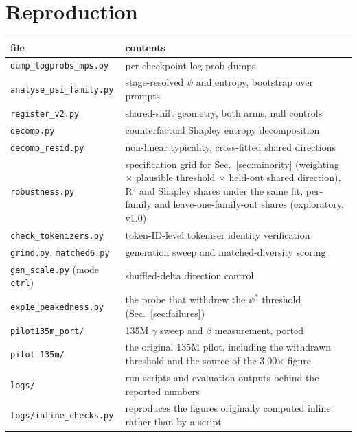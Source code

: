 \documentclass[11pt]{article}
\begin{document}
\appendix

\section{Reproduction}

\begin{center}
\begin{tabular}{p{} p{}}
\toprule
file & contents \\
\midrule
\texttt{dump\_logprobs\_mps.py} & per-checkpoint log-prob dumps \\
\texttt{analyse\_psi\_family.py} & stage-resolved $\psi$ and entropy, bootstrap over prompts \\
\texttt{register\_v2.py} & shared-shift geometry, both arms, null controls \\
\texttt{decomp.py} & counterfactual Shapley entropy decomposition \\
\texttt{decomp\_resid.py} & non-linear typicality, cross-fitted shared directions \\
\texttt{robustness.py} & specification grid for Sec.~\ref{sec:minority} (weighting $\times$ plausible threshold $\times$ held-out shared direction), R$^2$ and Shapley shares under the same fit, per-family and leave-one-family-out shares (exploratory, v1.0) \\
\texttt{check\_tokenizers.py} & token-ID-level tokeniser identity verification \\
\texttt{grind.py}, \texttt{matched6.py} & generation sweep and matched-diversity scoring \\
\texttt{gen\_scale.py} (mode \texttt{ctrl}) & shuffled-delta direction control \\
\texttt{exp1e\_peakedness.py} & the probe that withdrew the $\psi^{*}$ threshold (Sec.~\ref{sec:failures}) \\
\texttt{pilot135m\_port/} & 135M $\gamma$ sweep and $\beta$ measurement, ported \\
\texttt{pilot-135m/} & the original 135M pilot, including the withdrawn threshold and the source of the 3.00$\times$ figure \\
\texttt{logs/} & run scripts and evaluation outputs behind the reported numbers \\
\texttt{logs/inline\_checks.py} & reproduces the figures originally computed inline rather than by a script \\
\bottomrule
\end{tabular}
\end{center}
\end{document}
